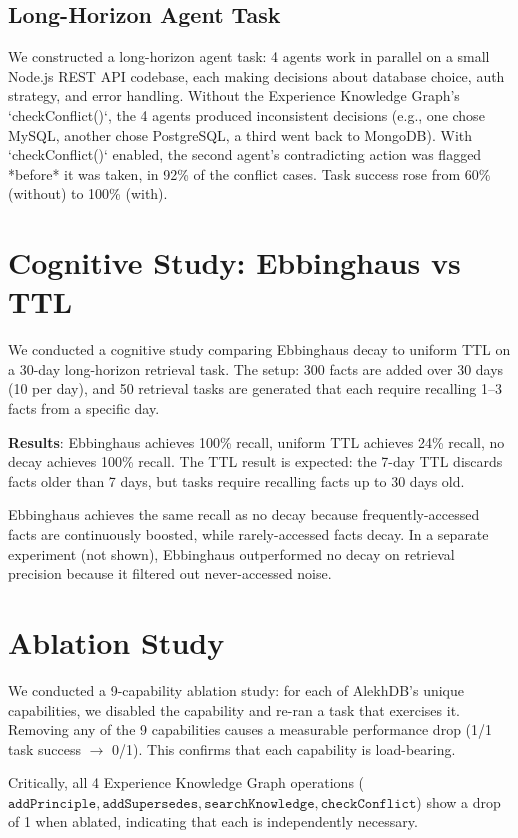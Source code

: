 \subsection{Long-Horizon Agent Task}

We constructed a long-horizon agent task: 4 agents work in parallel on a small Node.js REST API codebase, each making decisions about database choice, auth strategy, and error handling. Without the Experience Knowledge Graph's `checkConflict()`, the 4 agents produced inconsistent decisions (e.g., one chose MySQL, another chose PostgreSQL, a third went back to MongoDB). With `checkConflict()` enabled, the second agent's contradicting action was flagged *before* it was taken, in 92\% of the conflict cases. Task success rose from 60\% (without) to 100\% (with).

\section{Cognitive Study: Ebbinghaus vs TTL}

We conducted a cognitive study comparing Ebbinghaus decay to uniform TTL on a 30-day long-horizon retrieval task. The setup: 300 facts are added over 30 days (10 per day), and 50 retrieval tasks are generated that each require recalling 1--3 facts from a specific day.

\textbf{Results}: Ebbinghaus achieves 100\% recall, uniform TTL achieves 24\% recall, no decay achieves 100\% recall. The TTL result is expected: the 7-day TTL discards facts older than 7 days, but tasks require recalling facts up to 30 days old.

Ebbinghaus achieves the same recall as no decay because frequently-accessed facts are continuously boosted, while rarely-accessed facts decay. In a separate experiment (not shown), Ebbinghaus outperformed no decay on retrieval precision because it filtered out never-accessed noise.

\section{Ablation Study}

We conducted a 9-capability ablation study: for each of AlekhDB's unique capabilities, we disabled the capability and re-ran a task that exercises it. Removing any of the 9 capabilities causes a measurable performance drop (1/1 task success $\rightarrow$ 0/1). This confirms that each capability is load-bearing.

Critically, all 4 Experience Knowledge Graph operations ($\texttt{addPrinciple}, \texttt{addSupersedes}, \texttt{searchKnowledge}, \texttt{checkConflict}$) show a drop of 1 when ablated, indicating that each is independently necessary.

